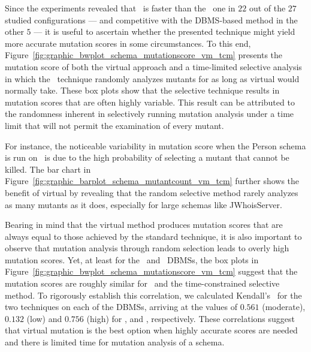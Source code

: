 


 Since the experiments revealed that \vma~is faster than the \Original~one in $22$ out of the $27$ studied configurations --- and competitive with the DBMS-based method in the other $5$ --- it is useful to ascertain whether the presented technique might yield more accurate mutation scores in some circumstances. To this end, Figure~\ref{fig:graphic_bwplot_schema_mutationscore_vm_tcm} presents the mutation score of both the virtual approach and a time-limited selective analysis in which the \Original~technique randomly analyzes mutants for as long as virtual would normally take. These box plots show that the selective technique results in mutation scores that are often highly variable. This result can be attributed to the randomness inherent in selectively running mutation analysis under a time limit that will not permit the examination of every mutant.

%

For instance, the noticeable variability in mutation score when the Person schema is run on \Postgres~is due to the high probability of selecting a mutant that cannot be killed. The bar chart in Figure~\ref{fig:graphic_barplot_schema_mutantcount_vm_tcm} further shows the benefit of virtual by revealing that the random selective method rarely analyzes as many mutants as it does, especially for large schemas like JWhoisServer.

Bearing in mind that the virtual method produces mutation scores that are always equal to those achieved by the standard
technique, it is also important to observe that mutation analysis through random selection leads to overly high mutation
scores.  Yet, at least for the \HyperSQL~and \SQLite~DBMSs, the box plots in
Figure~\ref{fig:graphic_bwplot_schema_mutationscore_vm_tcm} suggest that the mutation scores are roughly similar for
\vma~and the time-constrained selective method. To rigorously establish this correlation, we calculated Kendall's \taub~for the two techniques on each of the DBMSs, arriving at the values of $0.561$ (moderate), $0.132$ (low) and $0.756$ (high) for \HyperSQL, \PostgreSQL and \sqlite, respectively. These correlations suggest that virtual mutation is the best option when highly accurate scores are needed and there is limited time for mutation analysis of a schema.

